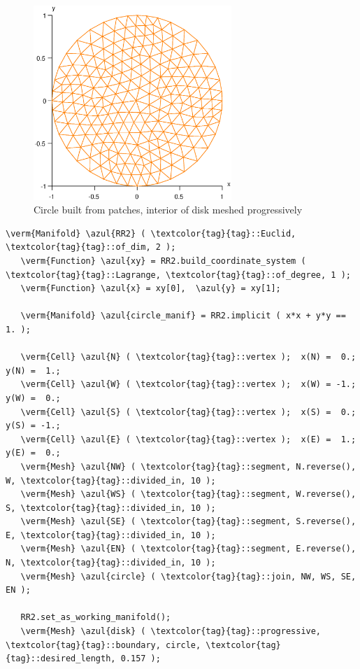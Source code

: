 \begin{figure} \centering
 \includegraphics[width=75mm]{disk-with-tri}
 \caption{Circle built from patches, interior of disk meshed progressively}
 \label{\numb section 3.\numb fig 1}
\end{figure}

\begin{Verbatim}[commandchars=\\\{\},formatcom=\small\tt,frame=single,
   label=parag-\ref{\numb section 3.\numb parag 1}.cpp,rulecolor=\color{coment},
   baselinestretch=0.94,framesep=2mm                                            ]
   \verm{Manifold} \azul{RR2} ( \textcolor{tag}{tag}::Euclid, \textcolor{tag}{tag}::of_dim, 2 );
   \verm{Function} \azul{xy} = RR2.build_coordinate_system ( \textcolor{tag}{tag}::Lagrange, \textcolor{tag}{tag}::of_degree, 1 );
   \verm{Function} \azul{x} = xy[0],  \azul{y} = xy[1];
   
   \verm{Manifold} \azul{circle_manif} = RR2.implicit ( x*x + y*y == 1. );
   
   \verm{Cell} \azul{N} ( \textcolor{tag}{tag}::vertex );  x(N) =  0.;   y(N) =  1.;
   \verm{Cell} \azul{W} ( \textcolor{tag}{tag}::vertex );  x(W) = -1.;   y(W) =  0.;
   \verm{Cell} \azul{S} ( \textcolor{tag}{tag}::vertex );  x(S) =  0.;   y(S) = -1.;
   \verm{Cell} \azul{E} ( \textcolor{tag}{tag}::vertex );  x(E) =  1.;   y(E) =  0.;
   \verm{Mesh} \azul{NW} ( \textcolor{tag}{tag}::segment, N.reverse(), W, \textcolor{tag}{tag}::divided_in, 10 );
   \verm{Mesh} \azul{WS} ( \textcolor{tag}{tag}::segment, W.reverse(), S, \textcolor{tag}{tag}::divided_in, 10 );
   \verm{Mesh} \azul{SE} ( \textcolor{tag}{tag}::segment, S.reverse(), E, \textcolor{tag}{tag}::divided_in, 10 );
   \verm{Mesh} \azul{EN} ( \textcolor{tag}{tag}::segment, E.reverse(), N, \textcolor{tag}{tag}::divided_in, 10 );
   \verm{Mesh} \azul{circle} ( \textcolor{tag}{tag}::join, NW, WS, SE, EN );
   
   RR2.set_as_working_manifold();
   \verm{Mesh} \azul{disk} ( \textcolor{tag}{tag}::progressive, \textcolor{tag}{tag}::boundary, circle, \textcolor{tag}{tag}::desired_length, 0.157 );
\end{Verbatim}

